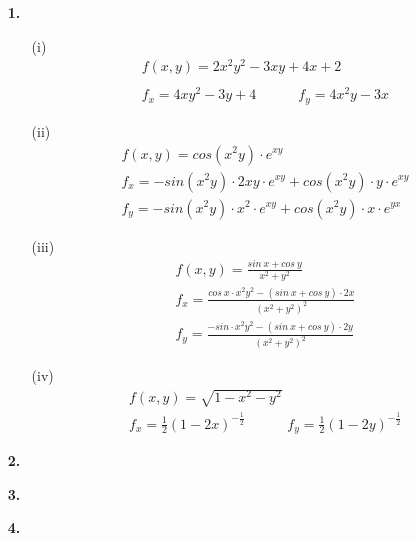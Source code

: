 \documentclass[a4paper,11pt]{article}
\title{\titleinfo}
\author{\authorinfotitle}
\date{\today}
\begin{document}
\maketitle
    \begin{enumerate}
        \item[\textbf{1.}]
        \begin{enumerate}
        	\item[(i)]
        	\begin{align*}
        &f(x,y) = 2x^2y^2-3xy+4x+2 \\ \\
        &f_x = 4xy^2 -3y + 4 \qquad \quad
        f_y = 4x^2y - 3x 
        	\end{align*}

        	\item[(ii)]
        	\begin{align*}
        &f(x,y) = cos(x^2y) \cdot e^{xy} \\[0.4cm]
        &f_x = -sin(x^2 y) \cdot 2xy \cdot e^{xy} + cos(x^2y) \cdot y \cdot e^{xy} \\[0.2cm]
        &f_y = -sin(x^2 y) \cdot x^2 \cdot e^{xy} + cos(x^2y) \cdot x \cdot e^{yx}	    
        	\end{align*}
       
        	\item[(iii)]
        	\begin{align*}
        &f(x,y) = \frac{sin \ x + cos \ y}{x^2 +y^2} \\[0.4cm]
        &f_x = \frac{cos \ x \cdot x^2y^2 - (sin \ x + cos \ y) \cdot 2x}{(x^2+y^2)^2} \\
        &f_y = \frac{-sin \cdot x^2y^2 - (sin \ x + cos \ y) \cdot 2y}{(x^2+y^2)^2} 
        	\end{align*}

        	\item[(iv)]
        	\begin{align*}
        &f(x,y) = \sqrt{1-x^2-y^2} \\[0.4cm]
       	&f_x = \frac{1}{2}(1-2x)^{-\frac{1}{2}} \qquad \quad
       	f_y = \frac{1}{2}(1-2y)^{-\frac{1}{2}} 
        	\end{align*}
       

        \end{enumerate}

        \item[\textbf{2.}]
        \todo
        \item[\textbf{3.}]
        \todo
        \item[\textbf{4.}]
        \todo    
    \end{enumerate}        
\end{document}
